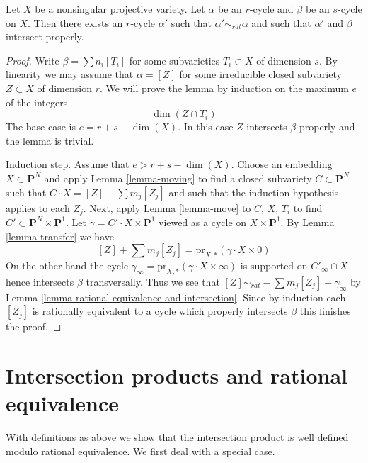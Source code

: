 \begin{lemma}
\label{lemma-moving-move}
Let $X$ be a nonsingular projective variety. Let $\alpha$ be an
$r$-cycle and $\beta$ be an $s$-cycle on $X$. Then there exists
an $r$-cycle $\alpha'$ such that $\alpha' \sim_{rat} \alpha$ and
such that $\alpha'$ and $\beta$ intersect properly.
\end{lemma}

\begin{proof}
Write $\beta = \sum n_i[T_i]$ for some subvarieties $T_i \subset X$
of dimension $s$. By linearity we may assume that $\alpha = [Z]$ for
some irreducible closed subvariety $Z \subset X$ of dimension $r$.
We will prove the lemma by induction on the maximum $e$ of the integers
$$
\dim(Z \cap T_i)
$$
The base case is $e = r + s - \dim(X)$. In this case $Z$ intersects
$\beta$ properly and the lemma is trivial.

\medskip\noindent
Induction step. Assume that $e > r + s - \dim(X)$. Choose an embedding
$X \subset \mathbf{P}^N$ and apply Lemma \ref{lemma-moving} to find a
closed subvariety $C \subset \mathbf{P}^N$ such that
$C \cdot X = [Z] + \sum m_j[Z_j]$ and such that the induction
hypothesis applies to each $Z_j$. Next, apply Lemma \ref{lemma-move}
to $C$, $X$, $T_i$ to find $C' \subset \mathbf{P}^N \times \mathbf{P}^1$.
Let $\gamma = C' \cdot X \times \mathbf{P}^1$ viewed as a cycle
on $X \times \mathbf{P}^1$. By Lemma \ref{lemma-transfer} we have
$$
[Z] + \sum m_j[Z_j] = \text{pr}_{X, *}(\gamma \cdot X \times 0)
$$
On the other hand the cycle
$\gamma_\infty = \text{pr}_{X, *}(\gamma \cdot X \times \infty)$
is supported on $C'_\infty \cap X$ hence intersects $\beta$ transversally.
Thus we see that $[Z] \sim_{rat} - \sum m_j[Z_j] + \gamma_\infty$
by Lemma \ref{lemma-rational-equivalence-and-intersection}. Since by
induction each $[Z_j]$ is rationally equivalent to a cycle which properly
intersects $\beta$ this finishes the proof.
\end{proof}



\section{Intersection products and rational equivalence}
\label{section-intersections-and-rational-equivalence}

\noindent
With definitions as above we show that the intersection product
is well defined modulo rational equivalence. We first deal with a
special case.

